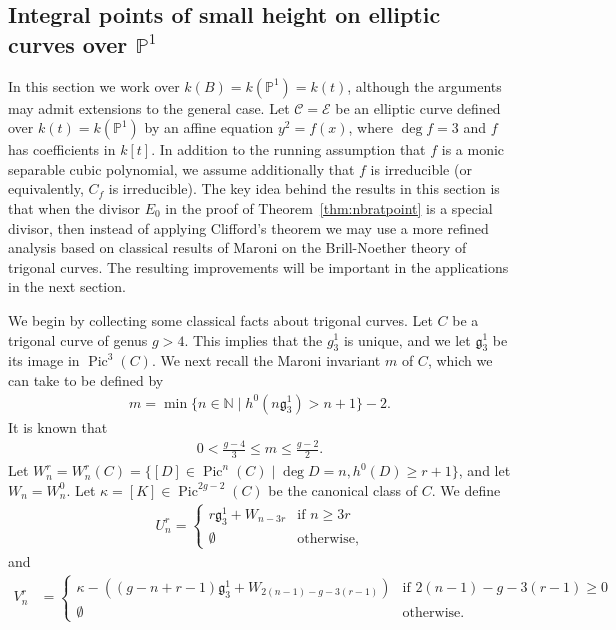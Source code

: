 \documentclass[11pt]{article}
\theoremstyle{plain}
\theoremstyle{definition}
\DeclareMathOperator{\Pic}{Pic}
\newcommand{\PP}{\mathbb{P}}
\begin{document}
\subsection{Integral points of small height on elliptic curves over $\PP^1$}

In this section we work over $k(B)=k(\mathbb{P}^1)=k(t)$, although the arguments may admit extensions to the general case. Let $\mathcal{C}=\mathcal{E}$ be an elliptic curve defined over $k(t)=k(\PP^1)$ by an affine equation $y^2=f(x)$, where $\deg f=3$ and $f$ has coefficients in $k[t]$. In addition to the running assumption that $f$ is a monic separable cubic polynomial, we assume additionally that $f$ is irreducible (or equivalently, $C_f$ is irreducible). The key idea behind the results in this section is that when the divisor $E_0$ in the proof of Theorem~\ref{thm:nbratpoint} is a special divisor, then instead of applying Clifford's theorem we may use a more refined analysis based on classical results of Maroni on the Brill-Noether theory of trigonal curves. The resulting improvements will be important in the applications in the next section.
 


We begin by collecting some classical facts about trigonal curves. Let $C$ be a trigonal curve of genus $g>4$. This implies that the $g_3^1$ is unique, and we let $\mathfrak{g}_3^1$ be its image in $\Pic^3(C)$. We next recall the Maroni invariant $m$ of $C$, which we can take to be defined by \cite[Eq. (1.2)]{MS}
\begin{align*}
m=\min\{n\in\mathbb{N}\mid h^0(n\mathfrak{g}_3^1)>n+1\}-2.
\end{align*}
It is known \cite[Eq. (1.1)]{MS} that 
\begin{align*}
0<\frac{g-4}{3}\leq m\leq \frac{g-2}{2}.
\end{align*}
Let $W^r_n=W^r_n(C)=\{[D]\in \Pic^n(C)\mid \deg D=n, h^0(D)\geq r+1\}$, and let $W_n=W^0_n$. Let $\kappa=[K]\in \Pic^{2g-2}(C)$ be the canonical class of $C$.
We define
\begin{align*}
U_n^r=\begin{cases}
r\mathfrak{g}_3^1+W_{n-3r} &\text{if }n\geq 3r\\
\emptyset &\text{otherwise},
\end{cases}
\end{align*}
and
\begin{align*}
V_n^r&=\begin{cases}
\kappa-((g-n+r-1)\mathfrak{g}_3^1+W_{2(n-1)-g-3(r-1)}) &\text{if }2(n-1)-g-3(r-1)\geq 0\\
\emptyset &\text{otherwise}.
\end{cases}
\end{align*}
\end{document}

